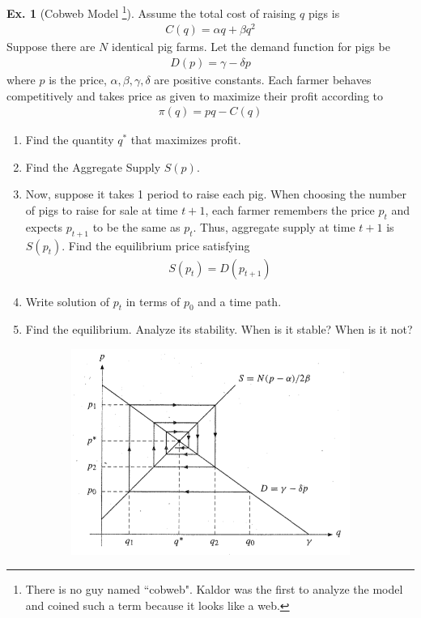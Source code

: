 \documentclass[11pt,a4paper]{book}
\theoremstyle{definition}\newtheorem{definition}{Definition}
\theoremstyle{definition}\newtheorem{fact}{Fact}
\theoremstyle{definition}\newtheorem{remark}{Remark}
\theoremstyle{definition}\newtheorem{ex}{Ex.}
\theoremstyle{definition}\newtheorem{project}{Project}
\theoremstyle{definition}\newtheorem{problem}{Problem}
\theoremstyle{definition}\newtheorem{example}{Example}
\numberwithin{theorem}{section}
\numberwithin{corollary}{chapter}
\numberwithin{assumption}{chapter}
\numberwithin{definition}{chapter}
\numberwithin{prop}{chapter}
\numberwithin{notation}{chapter}
\numberwithin{problem}{chapter}
\numberwithin{example}{chapter}
\numberwithin{fact}{chapter}
\numberwithin{ex}{chapter}
\begin{document}
	\begin{ex}[Cobweb Model \citep{kaldor1934classificatory} \footnote{There is no guy named ``cobweb". Kaldor was the first to analyze the model and coined such a term because it looks like a web.}]
		Assume the total cost of raising $q$ pigs is
		\begin{align*}
			C(q) = \alpha q + \beta q^2
		\end{align*}
		Suppose there are $N$ identical pig farms. Let the demand function for pigs be
		\begin{align*}
			D(p) = \gamma - \delta p
		\end{align*}
		where $p$ is the price, $\alpha,\beta,\gamma,\delta$ are positive constants. Each farmer behaves competitively and takes price as given to maximize their profit according to
		\begin{align*}
			\pi(q) = pq - C(q)
		\end{align*}
		\begin{enumerate}
			\item Find the quantity $q^*$ that maximizes profit.
			\item Find the Aggregate Supply $S(p)$.
			\item Now, suppose it takes 1 period to raise each pig. When choosing the number of pigs to raise for sale at time $t+1$, each farmer remembers the price $p_t$ and expects $p_{t+1}$ to be the same as $p_t$. Thus, aggregate supply at time $t+1$ is $S(p_t)$. Find the equilibrium price satisfying
			\begin{align*}
				S(p_t) = D(p_{t+1})
			\end{align*}
			\item Write solution of $p_t$ in terms of $p_0$ and a time path.
			\item Find the equilibrium. Analyze its stability. When is it stable? When is it not?
		\end{enumerate}
		\begin{figure}[ht]
			\centering
			\begin{subfigure}[b]{0.4\linewidth}
				\includegraphics[width=\linewidth]{figs/cobweb_dyn.png}

\end{subfigure}
\end{figure}
\end{ex}
\end{document}
